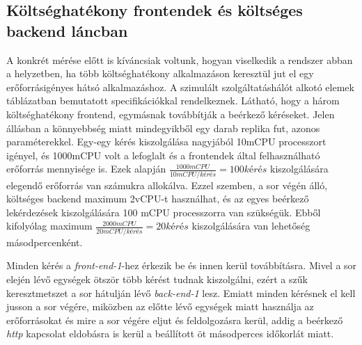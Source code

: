\lstset{caption=Elvégzett mérések száma, label=number_of_measurements}


\subsection{Költséghatékony frontendek és költséges backend láncban}
\label{subsec:3FE_1BE_chain}
A konkrét mérése előtt is kíváncsiak voltunk, hogyan viselkedik a rendszer abban a helyzetben, ha több költséghatékony alkalmazáson keresztül jut el egy erőforrásigényes hátsó alkalmazáshoz.
A szimulált szolgáltatáshálót alkotó elemek  táblázatban bemutatott specifikációkkal rendelkeznek.
Látható, hogy a három költséghatékony frontend, egymásnak továbbítják a beérkező kéréseket.
Jelen állásban a könnyebbség miatt mindegyikből egy darab replika fut, azonos paraméterekkel. 
Egy-egy kérés kiszolgálása nagyjából 10mCPU processzort igényel, és 1000mCPU volt a lefoglalt és a frontendek által felhasználható erőforrás mennyisége is. Ezek alapján $\frac{1000 mCPU}{10 mCPU/kérés} = 100 kérés$ kiszolgálására elegendő erőforrás van számukra allokálva.
Ezzel szemben, a sor végén álló, költséges backend maximum 2vCPU-t használhat, és az egyes beérkező lekérdezések kiszolgálására 100 mCPU processzorra van szükségük. Ebből kifolyólag maximum $\frac{2000 mCPU}{20 mCPU/kérés} = 20 kérés$ kiszolgálására van lehetőség másodpercenként. 

Minden kérés a \textit{front-end-1}-hez érkezik be és innen kerül továbbításra. Mivel a sor elején lévő egységek ötször több kérést tudnak kiszolgálni, ezért a szűk keresztmetszet a sor hátulján lévő \textit{back-end-1} lesz. Emiatt minden kérésnek el kell jusson a sor végére, miközben az előtte lévő egységek miatt használja az erőforrásokat és mire a sor végére eljut és feldolgozásra kerül, addig a beérkező \textit{http} kapcsolat eldobásra is kerül a beállított öt másodperces időkorlát miatt.

